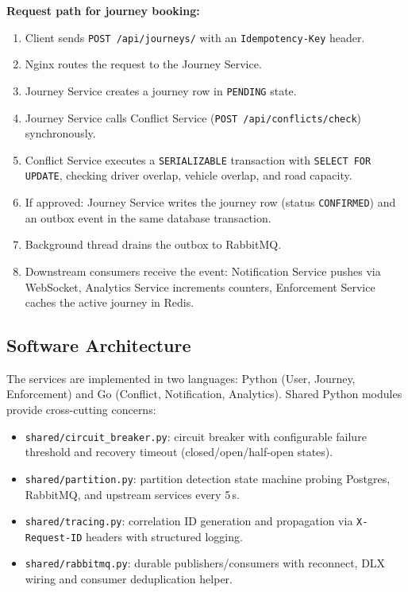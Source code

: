 \documentclass[12pt,a4paper]{article}
\begin{document}
\textbf{Request path for journey booking:}
 
\begin{enumerate}
    \item Client sends \texttt{POST /api/journeys/} with an \texttt{Idempotency-Key} header.
    \item Nginx routes the request to the Journey Service.
    \item Journey Service creates a journey row in \texttt{PENDING} state.
    \item Journey Service calls Conflict Service (\texttt{POST /api/conflicts/check}) synchronously.
    \item Conflict Service executes a \texttt{SERIALIZABLE} transaction with \texttt{SELECT FOR UPDATE}, checking driver overlap, vehicle overlap, and road capacity.
    \item If approved: Journey Service writes the journey row (status \texttt{CONFIRMED}) and an outbox event in the same database transaction.
    \item Background thread drains the outbox to RabbitMQ.
    \item Downstream consumers receive the event: Notification Service pushes via WebSocket, Analytics Service increments counters, Enforcement Service caches the active journey in Redis.
\end{enumerate}
 
\subsection{Software Architecture}
 
The services are implemented in two languages: Python (User, Journey, Enforcement) and Go (Conflict, Notification, Analytics). Shared Python modules provide cross-cutting concerns:
 
\begin{itemize}
    \item \texttt{shared/circuit\_breaker.py}: circuit breaker with configurable failure threshold and recovery timeout (closed/open/half-open states).
    \item \texttt{shared/partition.py}: partition detection state machine probing Postgres, RabbitMQ, and upstream services every 5\,s.
    \item \texttt{shared/tracing.py}: correlation ID generation and propagation via \texttt{X-Request-ID} headers with structured logging.
    \item \texttt{shared/rabbitmq.py}: durable publishers/consumers with reconnect, DLX wiring and consumer deduplication helper.
\end{itemize}
\end{document}
